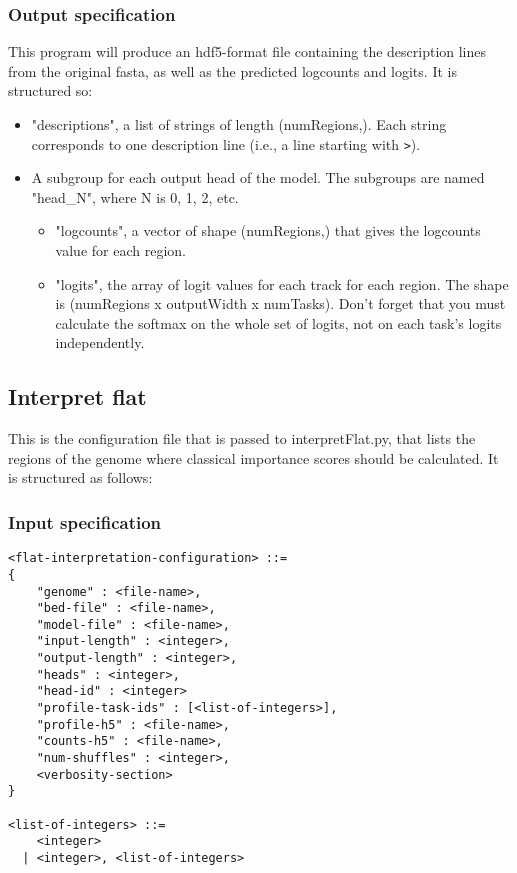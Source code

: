 \documentclass{article}
\begin{document}
\subsubsection{Output specification}

This program will produce an hdf5-format file containing the description lines from the original fasta, as well as the predicted logcounts and logits.
It is structured so:

\begin{itemize}
    \item "descriptions", a list of strings of length (numRegions,). Each string corresponds to one description line (i.e., a line starting with \texttt{>}). 
    \item A subgroup for each output head of the model. The subgroups are named "head\_N", where N is 0, 1, 2, etc. 
        \begin{itemize}
            \item "logcounts", a vector of shape (numRegions,) that gives the logcounts value for each region. 
            \item "logits", the array of logit values for each track for each region. The shape is (numRegions x outputWidth x numTasks). Don't forget that you must calculate the softmax on the whole set of logits, not on each task's logits independently.
        \end{itemize} 
\end{itemize}

\subsection{Interpret flat}

This is the configuration file that is passed to interpretFlat.py, that lists the regions of the genome where classical importance scores should be calculated. It is structured as follows:

\subsubsection{Input specification}

\begin{lstlisting}
<flat-interpretation-configuration> ::=
{
    "genome" : <file-name>,
    "bed-file" : <file-name>,
    "model-file" : <file-name>,
    "input-length" : <integer>,
    "output-length" : <integer>,
    "heads" : <integer>,
    "head-id" : <integer>
    "profile-task-ids" : [<list-of-integers>],
    "profile-h5" : <file-name>,
    "counts-h5" : <file-name>,
    "num-shuffles" : <integer>,
    <verbosity-section>
}

<list-of-integers> ::=
    <integer>
  | <integer>, <list-of-integers>

\end{lstlisting}
\end{document}
